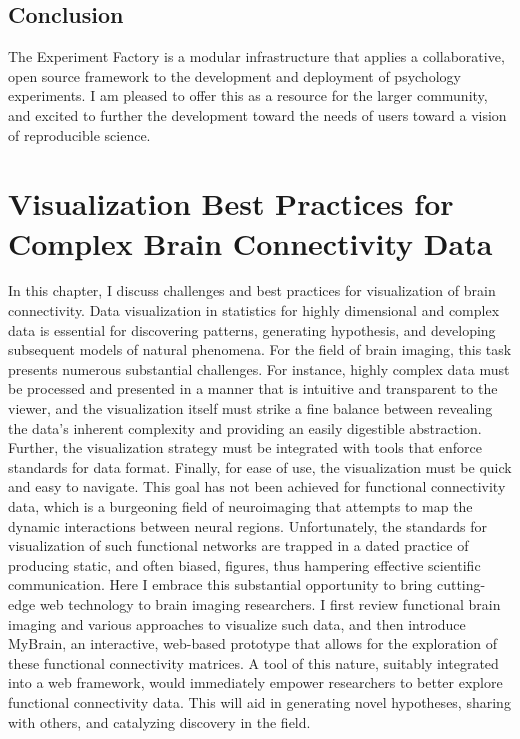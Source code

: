 \documentclass{report}
\begin{document}
\section{Conclusion}

The Experiment Factory is a modular infrastructure that applies a
collaborative, open source framework to the development and deployment
of psychology experiments. I am pleased to offer this as a resource for
the larger community, and excited to further the development toward the
needs of users toward a vision of reproducible science.

\chapter{Visualization Best Practices for Complex Brain Connectivity Data}

In this chapter, I discuss challenges and best practices for visualization of brain connectivity. Data visualization in statistics for highly dimensional and complex data is essential for discovering patterns, generating hypothesis, and developing subsequent models of natural phenomena.  For the field of brain imaging, this task presents numerous substantial challenges.  For instance, highly complex data must be processed and presented in a manner that is intuitive and transparent to the viewer, and the visualization itself must strike a fine balance between revealing the data’s inherent complexity and providing an easily digestible abstraction.  Further, the visualization strategy must be integrated with tools that enforce standards for data format. Finally, for ease of use, the visualization must be quick and easy to navigate.  This goal has not been achieved for functional connectivity data, which is a burgeoning field of neuroimaging that attempts to map the dynamic interactions between neural regions. Unfortunately, the standards for visualization of such functional networks are trapped in a dated practice of producing static, and often biased, figures, thus hampering effective scientific communication.  Here I embrace this substantial opportunity to bring cutting-edge web technology to brain imaging researchers.  I first review functional brain imaging and various approaches to visualize such data, and then introduce MyBrain, an interactive, web-based prototype that allows for the exploration of these functional connectivity matrices.  A tool of this nature, suitably integrated into a web framework, would immediately empower researchers to better explore functional connectivity data. This will aid in generating novel hypotheses, sharing with others, and catalyzing discovery in the field.
\end{document}
